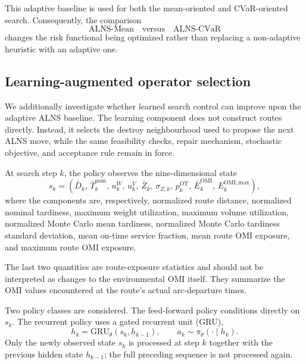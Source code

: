 \documentclass[preprint,12pt]{elsarticle}
\newcommand{\1}{\mathbf{1}}
\begin{document}
This adaptive baseline is used for both the mean-oriented and CVaR-oriented
search. Consequently, the comparison
\[
\text{ALNS-Mean}
\quad\text{versus}\quad
\text{ALNS-CVaR}
\]
changes the risk functional being optimized rather than replacing a
non-adaptive heuristic with an adaptive one.

\subsection{Learning-augmented operator selection}
\label{subsec:rl}

We additionally investigate whether learned search control can improve upon the
adaptive ALNS baseline. The learning component does not construct routes
directly. Instead, it selects the destroy neighbourhood used to propose the
next ALNS move, while the same feasibility checks, repair mechanism, stochastic
objective, and acceptance rule remain in force.

At search step $k$, the policy observes the nine-dimensional state
\begin{equation}
	s_k=
	\left(
	\bar D_k,\,
	\bar T^{\mathrm{nom}}_k,\,
	u^W_k,\,
	u^V_k,\,
	\bar Z_k,\,
	\sigma_{Z,k},\,
	p^{\mathrm{OT}}_k,\,
	\bar E^{\mathrm{OMI}}_k,\,
	E^{\mathrm{OMI,max}}_k
	\right),
	\label{eq:rl_state}
\end{equation}
where the components are, respectively, normalized route distance, normalized
nominal tardiness, maximum weight utilization, maximum volume utilization,
normalized Monte Carlo mean tardiness, normalized Monte Carlo tardiness
standard deviation, mean on-time service fraction, mean route OMI exposure,
and maximum route OMI exposure.

The last two quantities are route-exposure statistics and should not be
interpreted as changes to the environmental OMI itself. They summarize the
OMI values encountered at the route's actual arc-departure times.

Two policy classes are considered. The feed-forward policy conditions directly
on $s_k$. The recurrent policy uses a gated recurrent unit (GRU),
\begin{equation}
	h_k
	=
	\mathrm{GRU}_{\theta}(s_k,h_{k-1}),
	\qquad
	a_k
	\sim
	\pi_{\theta}(\cdot\mid h_k).
	\label{eq:gru_policy}
\end{equation}
Only the newly observed state $s_k$ is processed at step $k$ together with the
previous hidden state $h_{k-1}$; the full preceding sequence is not processed
again.
\end{document}
